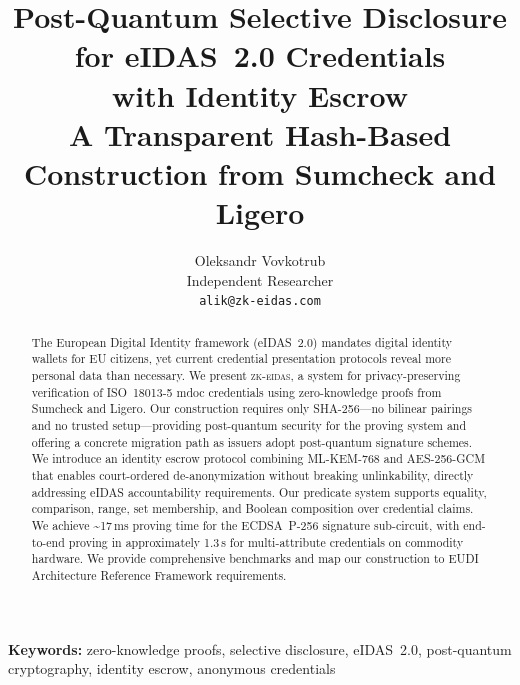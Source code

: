 \documentclass[11pt,a4paper]{article}
\title{Post-Quantum Selective Disclosure for eIDAS~2.0 Credentials\\with Identity Escrow\\[0.5em]
\large A Transparent Hash-Based Construction from Sumcheck and Ligero}
\author{Oleksandr Vovkotrub\\
\small Independent Researcher\\
\small \texttt{alik@zk-eidas.com}}
\newcommand{\keywords}[1]{\par\smallskip\noindent\textbf{Keywords:} #1}
\begin{document}
\maketitle

\begin{abstract}
The European Digital Identity framework (eIDAS~2.0) mandates digital identity
wallets for EU citizens, yet current credential presentation protocols reveal
more personal data than necessary. We present \textsc{zk-eidas}, a system for
privacy-preserving verification of ISO~18013-5 mdoc credentials using
zero-knowledge proofs from Sumcheck and Ligero. Our construction requires only
SHA-256---no bilinear pairings and no trusted setup---providing post-quantum
security for the proving system and offering a concrete migration path as
issuers adopt post-quantum signature schemes. We introduce an identity escrow
protocol combining ML-KEM-768 and AES-256-GCM that enables court-ordered
de-anonymization without breaking unlinkability, directly addressing eIDAS
accountability requirements. Our predicate system supports equality, comparison,
range, set membership, and Boolean composition over credential claims. We
achieve \textasciitilde17\,ms proving time for the ECDSA~P-256 signature
sub-circuit, with end-to-end proving in approximately 1.3\,s for
multi-attribute credentials on commodity hardware.
We provide comprehensive benchmarks and map our construction to EUDI
Architecture Reference Framework requirements.
\end{abstract}

\keywords{zero-knowledge proofs, selective disclosure, eIDAS~2.0,
post-quantum cryptography, identity escrow, anonymous credentials}














\end{document}
